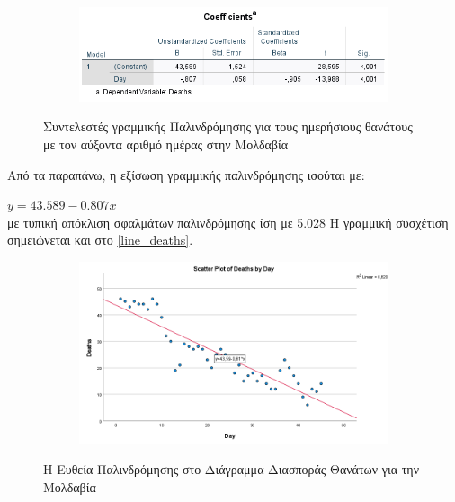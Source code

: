 \documentclass{article}
\begin{document}
    \begin{figure}[H]
    \centering
    \begin{adjustbox}{center}
    	\begin{subfigure}[c]{1\textwidth}    
    		\includegraphics[width=1\textwidth,height=\textheight,keepaspectratio]{media/2/coeff_deaths.png}
    	\end{subfigure}%
    \end{adjustbox}
    \caption{Συντελεστές γραμμικής Παλινδρόμησης για τους ημερήσιους θανάτους με τον αύξοντα αριθμό ημέρας στην Μολδαβία}
    \label{coeff_deaths}
    \end{figure} 
    \noindent
   Aπό τα παραπάνω, η εξίσωση γραμμικής παλινδρόμησης ισούται με:
    
    $ y = 43.589 - 0.807x $ \\
    με τυπική  απόκλιση  σφαλμάτων  παλινδρόμησης ίση με 5.028
    Η γραμμική συσχέτιση σημειώνεται και στο \autoref{line_deaths}.
    
    \begin{figure}[H]
    \centering
    \begin{adjustbox}{center}
    	\begin{subfigure}[c]{1\textwidth}    
    		\includegraphics[width=1\textwidth,height=\textheight,keepaspectratio]{media/2/line_deaths.png}
    	\end{subfigure}%
    \end{adjustbox}
    \caption{Η Ευθεία Παλινδρόμησης στο Διάγραμμα Διασποράς Θανάτων για την Μολδαβία}
    \label{line_deaths}
    \end{figure}    
\end{document}
